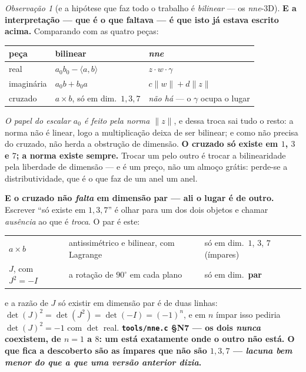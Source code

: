 \documentclass[11pt]{article}
\newcommand{\code}[1]{\texttt{\small #1}}
\theoremstyle{plain}
\theoremstyle{remark}
\newtheorem{obs}{Observação}
\providecommand{\medido}[1]{\textbf{#1}}
\begin{document}
\begin{obs}[e a hipótese que faz todo o trabalho é \emph{bilinear} --- os \emph{nne}-3D]
\textbf{E a interpretação --- que é o que faltava --- é que isto já estava escrito acima.} Comparando
com as quatro peças:
\begin{center}
\begin{tabular}{lll}
\toprule
\textbf{peça} & \textbf{bilinear} & \textbf{\emph{nne}} \\
\midrule
real & $a_0b_0-\langle a,b\rangle$ & $z\cdot w\cdot\gamma$ \\
imaginária & $a_0b+b_0a$ & $c\|w\|+d\|z\|$ \\
cruzado & $a\times b$, só em dim.\ $1,3,7$ & \emph{não há} --- o $\gamma$ ocupa o lugar \\
\bottomrule
\end{tabular}
\end{center}
\emph{O papel do escalar $a_0$ é feito pela norma $\|z\|$}, e dessa troca sai tudo o resto: a norma
não é linear, logo a multiplicação deixa de ser bilinear; e como não precisa do cruzado, não herda
a obstrução de dimensão. \textbf{O cruzado só existe em $1$, $3$ e $7$; a norma existe sempre.}
Trocar um pelo outro é trocar a bilinearidade pela liberdade de dimensão --- e é um preço, não um
almoço grátis: perde-se a distributividade, que é o que faz de um anel um anel.

\textbf{E o cruzado não \emph{falta} em dimensão par --- ali o lugar é de outro.} Escrever ``só
existe em $1,3,7$'' é olhar para um dos dois objetos e chamar \emph{ausência} ao que é
\emph{troca}. O par é este:
\begin{center}
\begin{tabular}{lll}
\toprule
$a\times b$ & antissimétrico e bilinear, com Lagrange & só em dim.\ $1$, $3$, $7$ (ímpares) \\
$J$, com $J^2=-I$ & a rotação de $90^\circ$ em cada plano & só em dim.\ \textbf{par} \\
\bottomrule
\end{tabular}
\end{center}
e a razão de $J$ só existir em dimensão par é de duas linhas: $\det(J)^2=\det(J^2)=\det(-I)=(-1)^n$,
e em $n$ ímpar isso pediria $\det(J)^2=-1$ com $\det$ real.
\medido{\code{tools/nne.c} §N7 --- os dois \emph{nunca} coexistem, de $n=1$ a $8$: um está
exatamente onde o outro não está. O que fica a descoberto são as ímpares que não são $1,3,7$ ---
\emph{lacuna bem menor do que a que uma versão anterior dizia}.}


\end{obs}
\end{document}
